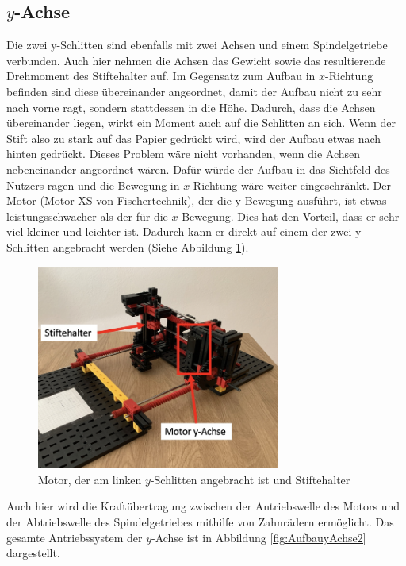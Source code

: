 \documentclass[conference,compsoc,final,a4paper]{IEEEtran}
\begin{document}
\subsection{$y$-Achse}

Die zwei y-Schlitten sind ebenfalls mit zwei Achsen und einem Spindelgetriebe verbunden. Auch hier nehmen die Achsen das Gewicht
sowie das resultierende Drehmoment des Stiftehalter auf. Im Gegensatz zum Aufbau in $x$-Richtung befinden sind diese übereinander angeordnet,
damit der Aufbau nicht zu sehr nach vorne ragt, sondern stattdessen in die Höhe. Dadurch, dass die Achsen übereinander liegen, wirkt ein Moment auch auf die Schlitten an sich. Wenn der Stift also zu stark auf das Papier gedrückt wird, wird der Aufbau etwas nach hinten gedrückt. Dieses Problem wäre nicht vorhanden, wenn die Achsen nebeneinander angeordnet wären. Dafür würde der Aufbau in das Sichtfeld des Nutzers ragen und die Bewegung in $x$-Richtung wäre weiter eingeschränkt. 
Der Motor (Motor XS von Fischertechnik), der die y-Bewegung ausführt, ist etwas leistungsschwacher als der für die $x$-Bewegung. Dies hat
den Vorteil, dass er sehr viel kleiner und leichter ist. Dadurch kann er direkt auf einem der zwei y-Schlitten angebracht werden (Siehe Abbildung \ref{fig:AufbauyAchse1}). 

\begin{figure}[h]
\centering
\includegraphics[width=8cm]{../images/yAchse1.png}
\caption{Motor, der am linken $y$-Schlitten angebracht ist und Stiftehalter}
\label{fig:AufbauyAchse1}
\end{figure}

Auch hier wird die Kraftübertragung zwischen der Antriebswelle des Motors und der Abtriebswelle des
Spindelgetriebes mithilfe von Zahnrädern ermöglicht. Das gesamte Antriebssystem der $y$-Achse ist in Abbildung \ref{fig:AufbauyAchse2} dargestellt.
\end{document}
